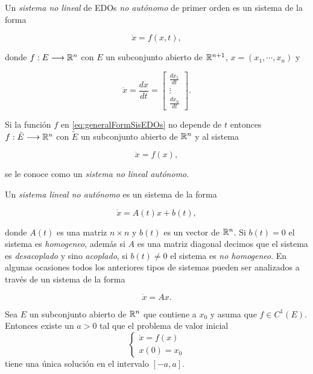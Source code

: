 Un \textit{sistema no lineal} de EDOs \textit{no autónomo} de primer orden es un sistema de la forma

\begin{equation}
	\dot{x} = f(x, t),
	\label{eq:generalFormSisEDOs}
\end{equation}

donde $f:E \longrightarrow {\mathbb{R}}^{n}$ con $E$ un subconjunto abierto de ${\mathbb{R}}^{n+1}$, $x = (x_{1}, \cdots, x_{n})$ y

\begin{equation*}
	\dot{x} = \frac{dx}{dt} = 
	\begin{bmatrix}
		\frac{dx_{1}}{dt} \\
		\vdots \\
		\frac{dx_{n}}{dt}
	\end{bmatrix}.
\end{equation*}

Si la función $f$ en \eqref{eq:generalFormSisEDOs} no depende de $t$ entonces $f:\tilde{E} \longrightarrow {\mathbb{R}}^{n}$ con $\tilde{E}$ un subconjunto abierto de ${\mathbb{R}}^{n}$ y al sistema 

\begin{equation}
	\dot{x} = f(x),
	\label{eq: sisAut}
\end{equation} 

se le conoce como un \textit{sistema no lineal autónomo}.

Un \textit{sistema lineal no autónomo} es un sistema de la forma

\begin{equation}
	\dot{x} = A(t)x + b(t),
	\label{eq: sistemaLineal}
\end{equation}

donde $A(t)$ es una matriz $n \times n$ y $b(t)$ es un vector de ${\mathbb{R}}^{n}$. Si $b(t) = 0$ el sistema es \textit{homogeneo}, además si $A$ es una matriz diagonal decimos que el sistema es \textit{desacoplado} y sino \textit{acoplado}, si $b(t) \neq 0$ el sistema es \textit{no homogeneo}. En algunas ocasiones todos los anteriores tipos de sistemas pueden ser analizados a través de un sistema de la forma

\begin{equation}
	\dot{x} = Ax.
	\label{eq: sisLinAuto}
\end{equation}

\begin{teo}\label{teo: Existencia y unicidad}
	Sea $E$ un subconjunto abierto de ${\mathbb{R}}^{n}$ que contiene a $x_{0}$ y asuma que $f \in C^{1}(E)$. Entonces existe un $a>0$ tal que el problema de valor inicial 
	\begin{equation}
		\left\{
		\begin{aligned}
			\dot{x} = f(x) \\
			x(0) = x_{0}
		\end{aligned}
		\right.
		\label{eq: pvi}
	\end{equation}
	tiene una única solución en el intervalo $[-a,a]$.
\end{teo}

